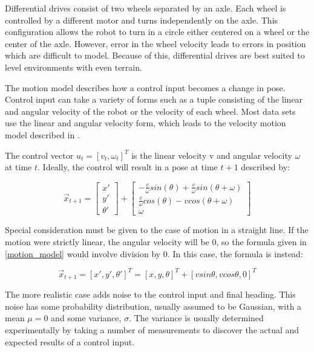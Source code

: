 Differential drives consist of two wheels separated by an axle.  Each wheel is controlled by a different motor and turns independently on the axle.  This configuration allows the robot to turn in a circle either centered on a wheel or the center of the axle.  However, error in the wheel velocity leads to errors in position which are difficult to model.  Because of this, differential drives are best suited to level environments with even terrain.  

The motion model describes how a control input becomes a change in pose.  Control input can take a variety of forms such as a tuple consisting of the linear and angular velocity of the robot or the velocity of each wheel.  Most data sets \cite{Radish} use the linear and angular velocity form, which leads to the velocity motion model described in \cite{ThrunPR2005}.

The control vector $u_{t} =[v_{t}, \omega_{t}]^T$ is the linear velocity v and angular velocity $\omega$ at time $t$.  Ideally, the control will result in a pose at time $t+1$ described by:

\begin{equation}\label{motion_model}
\vec{x}_{t+1}=
\left[ {\begin{array}{cc}
 x' \\
 y' \\
\theta'
\end{array} } \right] +
\left[ {\begin{array}{cc}
 -\frac{v}{\omega} sin(\theta)+\frac{v}{\omega} sin(\theta + \omega) \\
 \frac{v}{\omega} cos(\theta)-v cos(\theta + \omega)  \\
\omega
\end{array} } \right] 
\end{equation}


Special consideration must be given to the case of motion in a straight line.  If the motion were strictly linear, the angular velocity will be 0, so the formula given in \ref{motion_model} would involve division by 0.  In this case, the formula is instead:

\begin{equation}\label{motion_model2}
\vec{x}_{t+1}=[x', y', \theta']^T=[x, y, \theta]^T + [v sin\theta , v cos\theta, 0]^T 
\end{equation}

The more realistic case adds noise to the control input and final heading.  This noise has some probability distribution, usually assumed to be Gaussian, with a mean $\mu=0$ and some variance, $\sigma$.  The variance is usually determined experimentally by taking a number of measurements to discover the actual and expected results of a control input.


